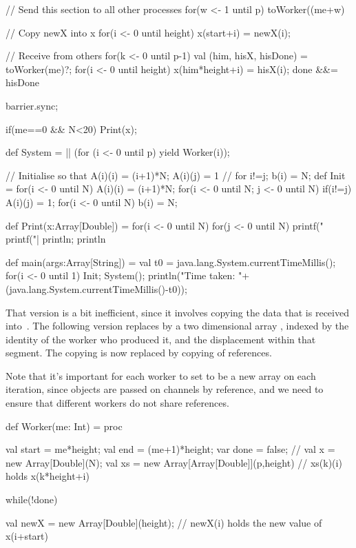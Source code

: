 \begin{answer}
\begin{scala}
{{{      // Send this section to all other processes
      for(w <- 1 until p) 
        toWorker((me+w)%

      // Copy newX into x
      for(i <- 0 until height) x(start+i) = newX(i);

      // Receive from others
      for(k <- 0 until p-1){
	val (him, hisX, hisDone) = toWorker(me)?;
	for(i <- 0 until height) x(him*height+i) = hisX(i);
	done &&= hisDone
      }

      barrier.sync;
    }
    if(me==0 && N<20) Print(x);
  }

  def System = || (for (i <- 0 until p) yield Worker(i));

  // Initialise so that A(i)(i) = (i+1)*N; A(i)(j) = 1 
  // for i!=j; b(i) = N;
  def Init = {
    for(i <- 0 until N) A(i)(i) = (i+1)*N;
    for(i <- 0 until N; j <- 0 until N) 
      if(i!=j) A(i)(j) = 1;
    for(i <- 0 until N) b(i) = N;
  }

  def Print(x:Array[Double]) = {
    for(i <- 0 until N){
      for(j <- 0 until N) printf("%
      printf("|%
      println; 
    }
    println
  }

  def main(args:Array[String]) = {
    val t0 = java.lang.System.currentTimeMillis();
    for(i <- 0 until 1){
      Init; System();
    }
    println("Time taken: "+
            (java.lang.System.currentTimeMillis()-t0));
  }
}
\end{scala}

That version is a bit inefficient, since it involves copying the data that is
received into~.  The following version replaces  by a two
dimensional array , indexed by the identity of the worker who
produced it, and the displacement within that segment.  The copying is now
replaced by copying of references.  

Note that it's important for each worker to set  to be a new array
on each iteration, since objects are passed on channels by reference, and we
need to ensure that different workers do not share references. 

\begin{scala}
def Worker(me: Int) = proc{
  val start = me*height; val end = (me+1)*height;
  var done = false;
  // val x = new Array[Double](N);
  val xs = new Array[Array[Double]](p,height)
  // xs(k)(i) holds x(k*height+i)

  while(!done){
    val newX = new Array[Double](height); 
    // newX(i) holds the new value of x(i+start)
     
}}
\end{scala}
\end{answer}
